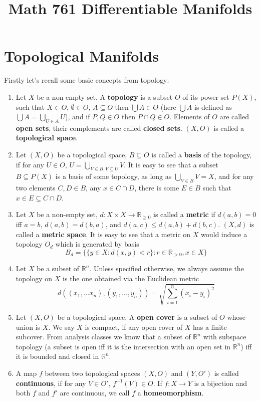 \documentclass{article}
\title{Math 761 Differentiable Manifolds}
\theoremstyle{definition}
\begin{document}
\maketitle

\tableofcontents

\newpage

\section{Topological Manifolds}

Firstly let's recall some basic concepts from topology:

\begin{enumerate}
    \item Let $X$ be a non-empty set. A {\bf topology} is a subset $O$ of its power set $P(X)$, such that $X\in O$, $\emptyset\in O$, $A\subseteq O$ then $\bigcup A\in O$ (here $\bigcup A$ is defined as $\bigcup A=\bigcup_{U\in A}U$), and if $P, Q\in O$ then $P\cap Q\in O$. Elements of $O$ are called {\bf open sets}, their complements are called {\bf closed sets}. $(X, O)$ is called a {\bf topological space}.
    \item Let $(X, O)$ be a topological space, $B\subseteq O$ is called a {\bf basis} of the topology, if for any $U\in O$, $U=\bigcup_{V\in B, V\subseteq U}V$. It is easy to see that a subset $B\subseteq P(X)$ is a basis of some topology, as long as $\bigcup_{V\in B}V=X$, and for any two elements $C, D\in B$, any $x\in C\cap D$, there is some $E\in B$ such that $x\in E\subseteq C\cap D$.
    \item Let $X$ be a non-empty set, $d: X\times X\rightarrow \mathbb{R}_{\geq 0}$ is called a {\bf metric} if $d(a, b)=0$ iff $a=b$, $d(a, b)=d(b, a)$, and $d(a, c)\leq d(a, b)+d(b, c)$. $(X, d)$ is called a {\bf metric space}. It is easy to see that a metric on $X$ would induce a topology $O_d$ which is generated by basis 
    \[B_d=\{\{y\in X: d(x, y)<r\}: r\in\mathbb{R}_{>0}, x\in X\}\] 
    \item Let $X$ be a subset of $\mathbb{R}^n$. Unless specified otherwise, we always assume the topology on $X$ is the one obtained via the Euclidean metric 
    \[d((x_1, \dots x_n), (y_1, \dots, y_n))=\sqrt{\sum_{i=1}^n (x_i-y_i)^2}\]
    \item Let $(X, O)$ be a topological space. A {\bf open cover} is a subset of $O$ whose union is $X$. We say $X$ is compact, if any open cover of $X$ has a finite subcover. From analysis classes we know that a subset of $\mathbb{R}^n$ with subspace topology (a subset is open iff it is the intersection with an open set in $\mathbb{R}^n$) iff it is bounded and closed in $\mathbb{R}^n$.
    \item A map $f$ between two topological spaces $(X, O)$ and $(Y, O')$ is called {\bf continuous}, if for any $V\in O'$, $f^{-1}(V)\in O$. If $f: X\rightarrow Y$ is a bijection and both $f$ and $f'$ are continuous, we call $f$ a {\bf homeomorphism}.
\end{enumerate}
\end{document}
